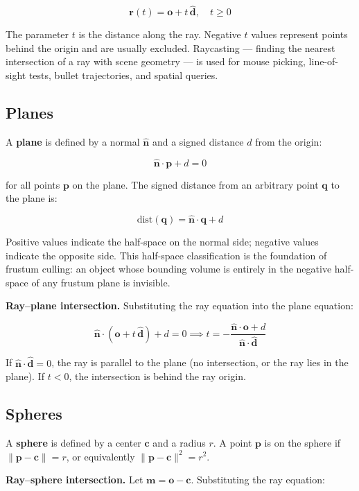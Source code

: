 \documentclass[
  11pt,
  letterpaper,
  DIV=11,
  numbers=noendperiod,
  twoside,
  open=right]{scrreprt}
\begin{document}
\[
\mathbf{r}(t) = \mathbf{o} + t \, \hat{\mathbf{d}}, \quad t \geq 0
\]

The parameter \(t\) is the distance along the ray. Negative \(t\) values
represent points behind the origin and are usually excluded. Raycasting
--- finding the nearest intersection of a ray with scene geometry --- is
used for mouse picking, line-of-sight tests, bullet trajectories, and
spatial queries.

\subsection{Planes}\label{planes}

A \textbf{plane} is defined by a normal \(\hat{\mathbf{n}}\) and a
signed distance \(d\) from the origin:

\[
\hat{\mathbf{n}} \cdot \mathbf{p} + d = 0
\]

for all points \(\mathbf{p}\) on the plane. The signed distance from an
arbitrary point \(\mathbf{q}\) to the plane is:

\[
\text{dist}(\mathbf{q}) = \hat{\mathbf{n}} \cdot \mathbf{q} + d
\]

Positive values indicate the half-space on the normal side; negative
values indicate the opposite side. This half-space classification is the
foundation of frustum culling: an object whose bounding volume is
entirely in the negative half-space of any frustum plane is invisible.

\textbf{Ray--plane intersection.} Substituting the ray equation into the
plane equation:

\[
\hat{\mathbf{n}} \cdot (\mathbf{o} + t \, \hat{\mathbf{d}}) + d = 0 \implies t = -\frac{\hat{\mathbf{n}} \cdot \mathbf{o} + d}{\hat{\mathbf{n}} \cdot \hat{\mathbf{d}}}
\]

If \(\hat{\mathbf{n}} \cdot \hat{\mathbf{d}} = 0\), the ray is parallel
to the plane (no intersection, or the ray lies in the plane). If
\(t < 0\), the intersection is behind the ray origin.

\subsection{Spheres}\label{spheres}

A \textbf{sphere} is defined by a center \(\mathbf{c}\) and a radius
\(r\). A point \(\mathbf{p}\) is on the sphere if
\(\|\mathbf{p} - \mathbf{c}\| = r\), or equivalently
\(\|\mathbf{p} - \mathbf{c}\|^2 = r^2\).

\textbf{Ray--sphere intersection.} Let
\(\mathbf{m} = \mathbf{o} - \mathbf{c}\). Substituting the ray equation:
\end{document}
